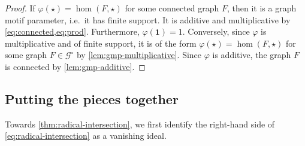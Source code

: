 \documentclass[11pt]{scrartcl}
\theoremstyle{definition}
\theoremstyle{plain}
\theoremstyle{remark}
\renewcommand\phi\varphi
\newcommand{\lG}{\mathcal{G}^\circ}
\begin{document}
	\thmSemiringHomChar*
	\begin{proof}
		If $\phi(\star) = \hom(F, \star)$ for some connected graph $F$,
		then it is a graph motif parameter, i.e.\ it has finite support.
		It is additive and multiplicative by \cref{eq:connected,eq:prod}.
		Furthermore, $\phi(\boldsymbol{1}) = 1$.
		Conversely,
		since $\phi$ is multiplicative and of finite support,
		it is of the form $\phi(\star) = \hom(F, \star)$ for some graph $F\in \lG$ by \cref{lem:gmp-multiplicative}.
		Since $\phi$ is additive,
		the graph $F$ is connected by \cref{lem:gmp-additive}.
	\end{proof}


	\subsection{Putting the pieces together}

	\label{sec:pieces}

	Towards \cref{thm:radical-intersection},
	we first identify the right-hand side of \eqref{eq:radical-intersection} as a vanishing ideal.
\end{document}
